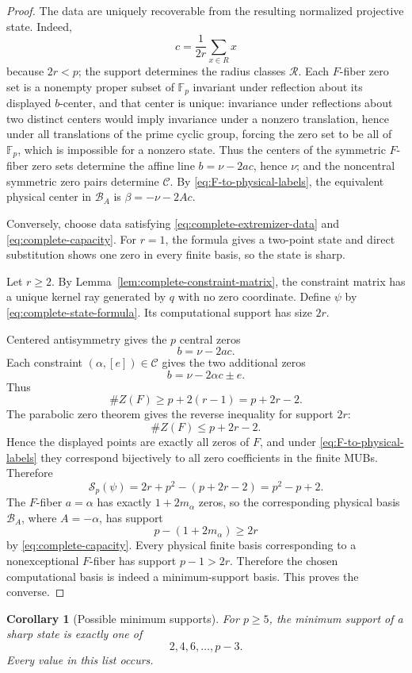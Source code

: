\documentclass[11pt]{article}
\newtheorem{corollary}[theorem]{Corollary}
\newcommand{\F}{\mathbb F}
\begin{document}
\begin{proof}
The data are uniquely recoverable from the resulting normalized
projective state.  Indeed,
\[
 c=\frac{1}{2r}\sum_{x\in R}x
\]
because \(2r<p\); the support determines the radius classes
\(\mathcal R\).  Each \(F\)-fiber zero set is a nonempty proper subset of \(\F_p\)
invariant under reflection about its displayed \(b\)-center, and that center
is unique: invariance under reflections about two distinct centers would
imply invariance under a nonzero translation, hence under all translations
of the prime cyclic group, forcing the zero set to be all of \(\F_p\), which
is impossible for a nonzero state.  Thus the centers of the symmetric
\(F\)-fiber zero sets determine the affine line \(b=\nu-2ac\), hence
\(\nu\); and the noncentral symmetric zero pairs determine \(\mathcal C\).
By \eqref{eq:F-to-physical-labels}, the equivalent physical center in
\(\mathcal B_A\) is \(\beta=-\nu-2Ac\).

Conversely, choose data satisfying
\eqref{eq:complete-extremizer-data} and
\eqref{eq:complete-capacity}.  For \(r=1\), the formula gives a
two-point state and direct substitution shows one zero in every finite
basis, so the state is sharp.

Let \(r\ge2\).  By
Lemma~\ref{lem:complete-constraint-matrix}, the constraint matrix has a
unique kernel ray generated by \(q\) with no zero coordinate.  Define
\(\psi\) by \eqref{eq:complete-state-formula}.  Its computational
support has size \(2r\).

Centered antisymmetry gives the \(p\) central zeros
\[
 b=\nu-2ac.
\]
Each constraint \((\alpha,[e])\in\mathcal C\) gives the two additional
zeros
\[
 b=\nu-2\alpha c\pm e.
\]
Thus
\[
 \#Z(F)\ge
 p+2(r-1)
 =
 p+2r-2.
\]
The parabolic zero theorem gives the reverse inequality for support
\(2r\):
\[
 \#Z(F)\le p+2r-2.
\]
Hence the displayed points are exactly all zeros of \(F\), and under
\eqref{eq:F-to-physical-labels} they correspond bijectively to all zero
coefficients in the finite MUBs.  Therefore
\[
 \mathcal S_p(\psi)
 =
 2r+p^2-(p+2r-2)
 =
 p^2-p+2.
\]
The \(F\)-fiber \(a=\alpha\) has exactly \(1+2m_\alpha\) zeros, so the
corresponding physical basis \(\mathcal B_A\), where \(A=-\alpha\), has support
\[
 p-(1+2m_\alpha)\ge2r
\]
by \eqref{eq:complete-capacity}.  Every physical finite basis corresponding
to a nonexceptional \(F\)-fiber has support \(p-1>2r\).  Therefore the chosen computational basis is indeed
a minimum-support basis.  This proves the converse.
\end{proof}

\begin{corollary}[Possible minimum supports]
\label{cor:possible-minimum-supports}
For \(p\ge5\), the minimum support of a sharp state is exactly one of
\[
 \boxed{
 2,4,6,\ldots,p-3.
 }
\]
Every value in this list occurs.
\end{corollary}
\end{document}
